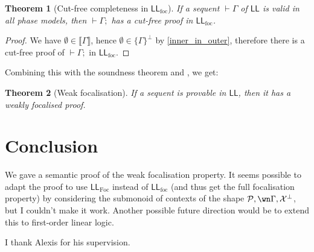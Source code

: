 \documentclass[11pt]{article}
\newtheorem{theorem}{Theorem}[section]
\newcommand\LL{\textsf{LL}}
\newcommand\0{\textbf{0}}
\newcommand\1{\textbf{1}}
\newcommand\LLfoc{{\LL_\text{foc}}}
\newcommand\LLFoc{{\LL_\text{Foc}}}
\newcommand\sem[1]{{\llbracket #1 \rrbracket}}
\begin{document}
\begin{theorem}[Cut-free completeness in $\LLfoc$]
    If a sequent $\vdash \Gamma$ of $\LL$ is valid in all phase models, then $\vdash \Gamma;$ has a cut-free proof in $\LLfoc$.
\end{theorem}
\begin{proof}
    We have $\emptyset \in \sem{\Gamma}$, hence $\emptyset \in \{\Gamma\}^\perp$ by
    \cref{inner_in_outer}, therefore there is a cut-free proof of $\vdash \Gamma;$ in $\LLfoc$.
\end{proof}

Combining this with the soundness theorem and \cite[proposition 1]{laurent}, we get:
\begin{theorem}[Weak focalisation]
    If a sequent is provable in $\LL$, then it has a weakly focalised proof.
\end{theorem}

\section{Conclusion}

We gave a semantic proof of the weak focalisation property. It seems possible to adapt the proof to use $\LLFoc$
instead of $\LLfoc$ (and thus get the full focalisation property) by considering the submonoid of contexts of the shape
$\mathcal P, \wn\Gamma, \mathcal X^\perp$, but I couldn't make it work.
Another possible future direction would be to extend this to first-order linear logic.

I thank Alexis for his supervision.

\printbibliography
\end{document}
